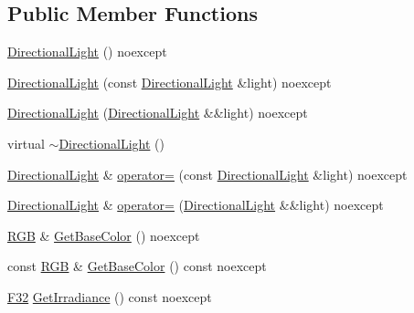 \subsection*{Public Member Functions}
\begin{DoxyCompactItemize}
\item 
\mbox{\hyperlink{classmage_1_1rendering_1_1_directional_light_a5a8c05a640ec86f4d1994d687de6415f}{Directional\+Light}} () noexcept
\item 
\mbox{\hyperlink{classmage_1_1rendering_1_1_directional_light_a95bac0f10225523a7aaf7d17503f6a5f}{Directional\+Light}} (const \mbox{\hyperlink{classmage_1_1rendering_1_1_directional_light}{Directional\+Light}} \&light) noexcept
\item 
\mbox{\hyperlink{classmage_1_1rendering_1_1_directional_light_aa8ff1e6487160eb851cc2c393be9ab6a}{Directional\+Light}} (\mbox{\hyperlink{classmage_1_1rendering_1_1_directional_light}{Directional\+Light}} \&\&light) noexcept
\item 
virtual \mbox{\hyperlink{classmage_1_1rendering_1_1_directional_light_a0f35f25f86aeb2ae688a8918fa3d8b76}{$\sim$\+Directional\+Light}} ()
\item 
\mbox{\hyperlink{classmage_1_1rendering_1_1_directional_light}{Directional\+Light}} \& \mbox{\hyperlink{classmage_1_1rendering_1_1_directional_light_aa81fa39a4d068d879a6d90587ee324d8}{operator=}} (const \mbox{\hyperlink{classmage_1_1rendering_1_1_directional_light}{Directional\+Light}} \&light) noexcept
\item 
\mbox{\hyperlink{classmage_1_1rendering_1_1_directional_light}{Directional\+Light}} \& \mbox{\hyperlink{classmage_1_1rendering_1_1_directional_light_abcb7fb355a9d3004fd2f9b597b6166d2}{operator=}} (\mbox{\hyperlink{classmage_1_1rendering_1_1_directional_light}{Directional\+Light}} \&\&light) noexcept
\item 
\mbox{\hyperlink{structmage_1_1_r_g_b}{R\+GB}} \& \mbox{\hyperlink{classmage_1_1rendering_1_1_directional_light_a492e5d6a02efa369437b606be8401985}{Get\+Base\+Color}} () noexcept
\item 
const \mbox{\hyperlink{structmage_1_1_r_g_b}{R\+GB}} \& \mbox{\hyperlink{classmage_1_1rendering_1_1_directional_light_aca3e27ba1d32b1146d3250827c1efb5f}{Get\+Base\+Color}} () const noexcept
\item 
\mbox{\hyperlink{namespacemage_aa97e833b45f06d60a0a9c4fc22ae02c0}{F32}} \mbox{\hyperlink{classmage_1_1rendering_1_1_directional_light_a1cba2b0099366af146c3ccf364946bf8}{Get\+Irradiance}} () const noexcept
\item 

\end{DoxyCompactItemize}

